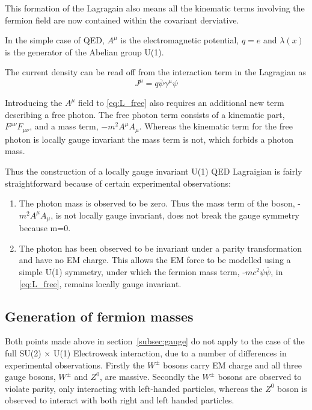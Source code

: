 This formation of the Lagragain also means all the kinematic terms involving the fermion field are now contained within the covariant derviative.

In the simple case of QED, $A^{\mu}$ is the electromagnetic potential, $q = e$ and $\lambda(x)$ is the generator of the Abelian group U(1).

The current density can be read off from the interaction term in the Lagragian as
\begin{equation}
  J^{\mu} = q\overline{\psi}\gamma^{\mu}\psi
\end{equation}

Introducing the $A^{\mu}$ field to \autoref{eq:L_free} also requires an additional new term describing a free photon. The free photon term consists of a kinematic part, $F^{\mu\nu}F_{\mu\nu}$, and a mass term, $-m^{2}A^{\mu}A_{\mu}$. Whereas the kinematic term for the free photon is locally gauge invariant the mass term is not, which forbids a photon mass.

Thus the construction of a locally gauge invariant U(1) QED Lagraigian is fairly straightforward because of certain experimental observations:
\begin{enumerate}
\item
  The photon mass is observed to be zero. Thus the mass term of the boson, -$m^{2}A^{\mu}A_{\mu}$, is not locally gauge invariant, does not break the gauge symmetry because m=0.
\item
  The photon has been observed to be invariant under a parity transformation and have no EM charge. This allows the EM force to be modelled using a  simple U(1) symmetry, under which the fermion mass term, -$mc^{2}\psi\overline{\psi}$, in \autoref{eq:L_free}, remains locally gauge invariant.

\end{enumerate}
\subsection{Generation of fermion masses}
Both points made above in section~\ref{subsec:gauge} do not apply to the case of the full SU(2) $\times$ U(1) Electroweak interaction, due to a number of differences in experimental observations. Firstly the $W^{\pm}$ bosons carry EM charge and all three gauge bosons, $W^{\pm}$ and $Z^{0}$, are massive. Secondly the $W^{\pm}$ bosons are observed to violate parity, only interacting with left-handed particles, whereas the $Z^{0}$ boson is observed to interact with both right and left handed particles. 

